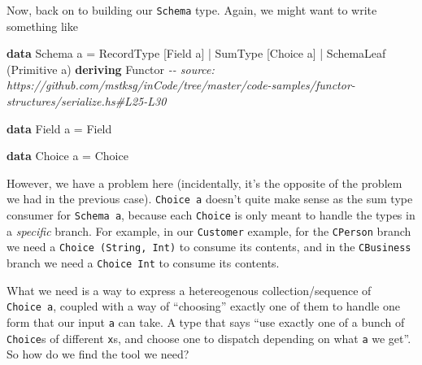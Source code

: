 \documentclass[]{article}
\newenvironment{Shaded}{}{}
\newcommand{\CommentTok}[1]{\textcolor[rgb]{0.38,0.63,0.69}{\textit{#1}}}
\newcommand{\DataTypeTok}[1]{\textcolor[rgb]{0.56,0.13,0.00}{#1}}
\newcommand{\KeywordTok}[1]{\textcolor[rgb]{0.00,0.44,0.13}{\textbf{#1}}}
\newcommand{\NormalTok}[1]{#1}
\newcommand{\OperatorTok}[1]{\textcolor[rgb]{0.40,0.40,0.40}{#1}}
\newcommand{\OtherTok}[1]{\textcolor[rgb]{0.00,0.44,0.13}{#1}}
\begin{document}
Now, back on to building our \texttt{Schema} type. Again, we might want to write
something like

\begin{Shaded}
\begin{Highlighting}[]
\KeywordTok{data} \DataTypeTok{Schema}\NormalTok{ a }\OtherTok{=}
      \DataTypeTok{RecordType}\NormalTok{  [}\DataTypeTok{Field}\NormalTok{ a]}
    \OperatorTok{|} \DataTypeTok{SumType}\NormalTok{     [}\DataTypeTok{Choice}\NormalTok{ a]}
    \OperatorTok{|} \DataTypeTok{SchemaLeaf}\NormalTok{  (}\DataTypeTok{Primitive}\NormalTok{ a)}
  \KeywordTok{deriving} \DataTypeTok{Functor}
\CommentTok{{-}{-} source: https://github.com/mstksg/inCode/tree/master/code{-}samples/functor{-}structures/serialize.hs\#L25{-}L30}

\KeywordTok{data} \DataTypeTok{Field}\NormalTok{ a }\OtherTok{=} \DataTypeTok{Field}

\KeywordTok{data} \DataTypeTok{Choice}\NormalTok{ a }\OtherTok{=} \DataTypeTok{Choice}
\end{Highlighting}
\end{Shaded}

However, we have a problem here (incidentally, it's the opposite of the problem
we had in the previous case). \texttt{Choice\ a} doesn't quite make sense as the
sum type consumer for \texttt{Schema\ a}, because each \texttt{Choice} is only
meant to handle the types in a \emph{specific} branch. For example, in our
\texttt{Customer} example, for the \texttt{CPerson} branch we need a
\texttt{Choice\ (String,\ Int)} to consume its contents, and in the
\texttt{CBusiness} branch we need a \texttt{Choice\ Int} to consume its
contents.

What we need is a way to express a hetereogenous collection/sequence of
\texttt{Choice\ a}, coupled with a way of ``choosing'' exactly one of them to
handle one form that our input \texttt{a} can take. A type that says ``use
exactly one of a bunch of \texttt{Choice}s of different \texttt{x}s, and choose
one to dispatch depending on what \texttt{a} we get''. So how do we find the
tool we need?
\end{document}
